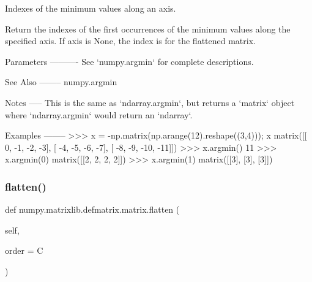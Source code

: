 \begin{DoxyVerb}Indexes of the minimum values along an axis.

Return the indexes of the first occurrences of the minimum values
along the specified axis.  If axis is None, the index is for the
flattened matrix.

Parameters
----------
See `numpy.argmin` for complete descriptions.

See Also
--------
numpy.argmin

Notes
-----
This is the same as `ndarray.argmin`, but returns a `matrix` object
where `ndarray.argmin` would return an `ndarray`.

Examples
--------
>>> x = -np.matrix(np.arange(12).reshape((3,4))); x
matrix([[  0,  -1,  -2,  -3],
[ -4,  -5,  -6,  -7],
[ -8,  -9, -10, -11]])
>>> x.argmin()
11
>>> x.argmin(0)
matrix([[2, 2, 2, 2]])
>>> x.argmin(1)
matrix([[3],
[3],
[3]])\end{DoxyVerb}
 \mbox{\label{classnumpy_1_1matrixlib_1_1defmatrix_1_1matrix_ad46e381ae69336b5185dd9d36508ab6a}} 
\subsubsection{\texorpdfstring{flatten()}{flatten()}}
{\footnotesize\ttfamily def numpy.\+matrixlib.\+defmatrix.\+matrix.\+flatten (\begin{DoxyParamCaption}\item[{}]{self,  }\item[{}]{order = {\ttfamily \textquotesingle{}C\textquotesingle{}} }\end{DoxyParamCaption})}

